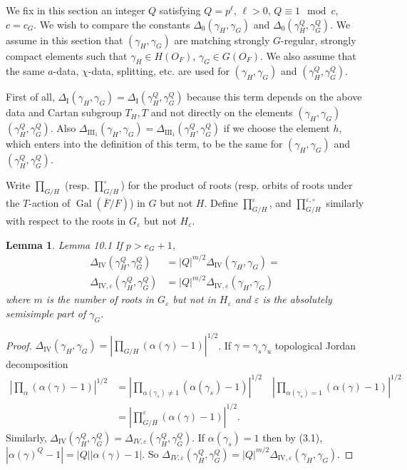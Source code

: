 \documentclass[11pt]{amsart}
\theoremstyle{plain}
\newtheorem{lemma}[theorem]{Lemma}
\theoremstyle{definition}
\def\Gal{\operatorname{\text{Gal}}}          %
\def\varep{\varepsilon}
\def\hgam{\gamma_H}
\def\ggam{\gamma_G}
\begin{document}
We fix in this section an integer $Q$ satisfying $Q=p^\ell$, $\ell>0$, $Q\equiv 1
\mod c$, $c=c_G$.
We wish to compare the constants
$\Delta_0(\hgam,\ggam)$ and  $\Delta_0(\hgam^Q,\ggam^Q)$.
We assume in this section that
$(\hgam,\ggam)$ are matching strongly $G$-regular, strongly compact elements
such that $\hgam\in H(O_F)$,
$\ggam\in G(O_F)$.  
We also assume that the same $a$-data,
$\chi$-data, splitting, etc. are used for
$(\hgam,\ggam)$ and $(\hgam^Q,\ggam^Q)$.

First of all, $\Delta_{\text{I}}(\hgam,\ggam)=
\Delta_{\text{I}}(\hgam^Q,\ggam^Q)$
because this term depends on the above data and
Cartan subgroup $T_H,T$ and not directly on the 
elements $(\hgam,\ggam)$\ $(\hgam^Q,\ggam^Q)$.
Also $\Delta_{\text{III}_1}(\hgam,\ggam) =
\Delta_{\text{III}_1}(\hgam^Q,\ggam^Q)$
if we choose the element $h$, which enters into the
definition of this term, to be the same for
$(\hgam,\ggam)$ and $(\hgam^Q,\ggam^Q)$.

Write $\prod_{G/H}$ (resp. $\prod_{G/H}^{\circ}$) for the product of roots 
(resp. orbits of roots under the $T$-action of $\Gal(\overline F/F)$)
in $G$ but not $H$.  Define $\prod_{G/H}^\varep$, and $\prod_{G/H}^{\varep,\circ}$
similarly with respect to the roots in $G_\varep$ but not $H_\varep$.

\begin{lemma}{Lemma 10.1}  If $p>e_G+1$, 
$$
\begin{array}{lll}
\Delta_{\text{IV}}(\hgam^Q,\ggam^Q) 
&= |Q|^{m/2}\Delta_{\text{IV}}(\hgam,\ggam)=\\
\Delta_{\text{IV},\varep}
(\hgam^Q,\ggam^Q)
&=|Q|^{m/2}\Delta_{\text{IV},\varep}(\hgam,\ggam)
\end{array}
$$
where $m$ is the number of roots in $G_\varep$
but not in $H_\varep$ and $\varep$ is the absolutely semisimple part 
of $\ggam$.
\end{lemma}

\begin{proof}  $\Delta_{\text{IV}}(\hgam,\ggam)
=|\prod_{G/H}(\alpha(\gamma)-1)|^{1/2}$. If
$\gamma=\gamma_s\gamma_u$ topological Jordan decomposition
$$
\begin{array}{lll}
|\prod_\alpha(\alpha(\gamma)-1)|^{1/2}
&= |
\prod_{ \alpha(\gamma_s)\ne1}
(\alpha(\gamma_s)-1)|^{1/2}\quad
|\prod_{\alpha(\gamma_s)=1}
(\alpha(\gamma)-1)|^{1/2}\\
&=
|\prod_{G/H}^\varep(\alpha(\gamma)-1)|^{1/2}.
\end{array}
$$
Similarly, $\Delta_{\text{IV}}(\hgam^Q,\ggam^Q)=\Delta_{IV,\varep}
(\hgam^Q,\ggam^Q)$. If
$\alpha(\gamma_s)=1$ then by (3.1),
$|\alpha(\gamma)^Q-1|
=|Q||\alpha(\gamma)-1|$.
So
$\Delta_{IV,\varep}(\hgam^Q,\ggam^Q)
=|Q|^{m/2}\Delta_{\text{IV},\varep}(\hgam,\ggam)$.
\end{proof}
\end{document}
